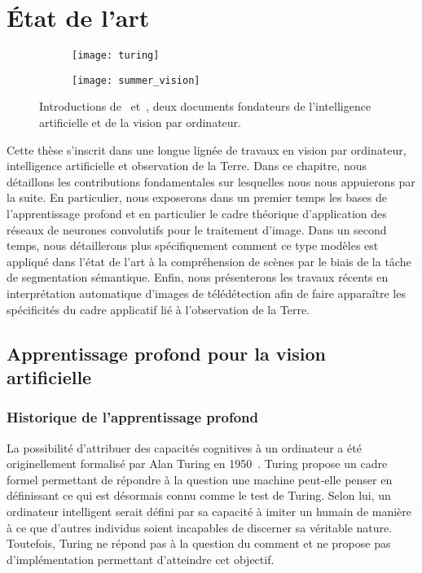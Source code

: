 \chapter{État de l'art}
\label{chap:etat}
\minitoc
\newpage

\begin{figure}
  \begin{subfigure}{0.5\textwidth}
     \texttt{[image: turing]}
  \end{subfigure}
  \begin{subfigure}{0.5\textwidth}
     \texttt{[image: summer\_vision]}
  \end{subfigure}
  \caption{Introductions de~\citet{turing_computing_1950} et~\citet{papert_summer_1966}, deux documents fondateurs de l'intelligence artificielle et de la vision par ordinateur.}
  \label{fig:introductions}
\end{figure}

Cette thèse s'inscrit dans une longue lignée de travaux en vision par ordinateur, intelligence artificielle et observation de la Terre. Dans ce chapitre, nous détaillons les contributions fondamentales sur lesquelles nous nous appuierons par la suite. En particulier, nous exposerons dans un premier temps les bases de l'apprentissage profond et en particulier le cadre théorique d'application des réseaux de neurones convolutifs pour le traitement d'image. Dans un second temps, nous détaillerons plus spécifiquement comment ce type modèles est appliqué dans l'état de l'art à la compréhension de scènes par le biais de la tâche de segmentation sémantique. Enfin, nous présenterons les travaux récents en interprétation automatique d'images de télédétection afin de faire apparaître les spécificités du cadre applicatif lié à l'observation de la Terre.

\section{Apprentissage profond pour la vision artificielle}

\subsection{Historique de l'apprentissage profond}

La possibilité d'attribuer des capacités cognitives à un ordinateur a été originellement formalisé par Alan Turing en 1950~\cite{turing_computing_1950}. Turing propose un cadre formel permettant de répondre à la question \og{} une machine peut-elle penser \fg{} en définissant ce qui est désormais connu comme le test de Turing. Selon lui, un ordinateur intelligent serait défini par sa capacité à imiter un humain de manière à ce que d'autres individus soient incapables de discerner sa véritable nature. Toutefois, Turing ne répond pas à la question du \og comment \fg{} et ne propose pas d'implémentation permettant d'atteindre cet objectif.

